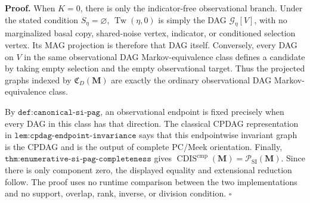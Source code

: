 \textbf{Proof.}
When \(K=0\), there is only the indicator-free observational branch.  Under the stated condition \(S_\eta=\varnothing\), \(\operatorname{Tw}(\eta,0)\) is simply the DAG \(\mathcal G_\eta[V]\), with no marginalized basal copy, shared-noise vertex, indicator, or conditioned selection vertex.  Its MAG projection is therefore that DAG itself.  Conversely, every DAG on \(V\) in the same observational DAG Markov-equivalence class defines a candidate by taking empty selection and the empty observational target.  Thus the projected graphs indexed by \(\mathfrak C_D(\mathbf M)\) are exactly the ordinary observational DAG Markov-equivalence class.

By \(\texttt{def:canonical-si-pag}\), an observational endpoint is fixed precisely when every DAG in this class has that direction.  The classical CPDAG representation in \(\texttt{lem:cpdag-endpoint-invariance}\) says that this endpointwise invariant graph is the CPDAG and is the output of complete PC/Meek orientation.  Finally, \(\texttt{thm:enumerative-si-pag-completeness}\) gives \(\operatorname{CDIS}^{\mathrm{cmp}}(\mathbf M)=\mathcal P_{\mathrm{SI}}(\mathbf M)\).  Since there is only component zero, the displayed equality and extensional reduction follow.  The proof uses no runtime comparison between the two implementations and no support, overlap, rank, inverse, or division condition. \(\square\)